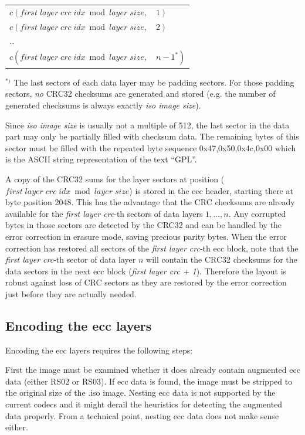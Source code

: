\begin{tabular}{l}
$c(first\; layer\; crc\; idx \bmod layer\; size, \quad 1)$\\
$c(first\; layer\; crc\; idx \bmod layer\; size, \quad 2)$\\
\dots\\
$c(first\; layer\; crc\; idx \bmod layer\; size, \quad n-1^*)$\\
\end{tabular}

\bigskip

$^{*)}$ The last sectors of each data layer may be padding sectors. For those padding
sectors, {\em no} CRC32 checksums are generated and stored (e.g. the number of
generated checksums is always exactly {\em iso image size}).

Since {\em iso image size} is usually not a multiple of 512, the last sector in
the data part may only be partially filled with checksum data. The remaining
bytes of this sector must be filled with the repeated byte sequence
0x47,0x50,0x4c,0x00 which is the ASCII string representation of the text ``GPL''.

\smallskip

A copy of the CRC32 sums for the layer sectors at position ($first\; layer\; crc\; idx \bmod layer\; size$)
is stored in the ecc header, starting there at byte position 2048. This has the advantage that
the CRC checksums are already available for the {\em first layer crc}-th sectors
of data layers $1,\ldots,n$. Any corrupted bytes in those sectors are
detected by the CRC32 and can be handled by the error correction in erasure mode,
saving precious parity bytes. When the error correction has restored all sectors
of the {\em first layer crc}-th ecc block, note that the {\em first layer crc}-th
sector of data layer $n$ will contain the CRC32 checksums for the data sectors 
in the next ecc block ({\em first layer crc + 1}). Therefore the layout is robust
against loss of CRC sectors as they are restored by the error correction just
before they are actually needed.

\subsection{Encoding the ecc layers}
\label{encoding-two}

Encoding the ecc layers requires the following steps:

\medskip

First the image must be examined whether it does already contain
augmented ecc data (either RS02 or RS03). If ecc data is found, the
image must be stripped to the original size of the .iso image. 
Nesting ecc data is not supported by the current codecs and it
might derail the heuristics for detecting the augmented data
properly. From a technical point, nesting ecc data does not
make sense either.

